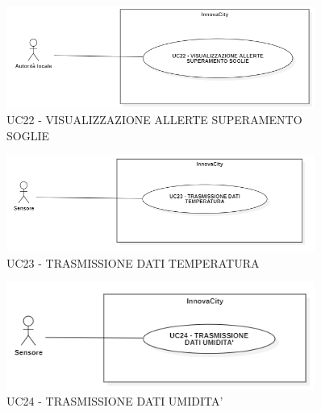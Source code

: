 
\begin{figure}[H]
    \centering
    \includegraphics[width=0.9\textwidth]{../Images/uc22.PNG}
    \caption{UC22 - VISUALIZZAZIONE ALLERTE SUPERAMENTO SOGLIE}
\end{figure}



\begin{figure}[H]
    \centering
    \includegraphics[width=0.9\textwidth]{../Images/uc23.PNG}
    \caption{UC23 - TRASMISSIONE DATI TEMPERATURA}
\end{figure}



\begin{figure}[H]
    \centering
    \includegraphics[width=0.9\textwidth]{../Images/uc24.PNG}
    \caption{UC24 - TRASMISSIONE DATI UMIDITA'}
\end{figure}


